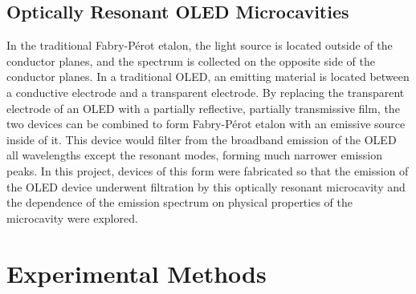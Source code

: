 \documentclass{report}
\begin{document}
    \section{Optically Resonant OLED Microcavities}
        In the traditional Fabry-P\'erot etalon, the light source is located outside of the conductor planes, and the spectrum is collected on the opposite side of the conductor planes. In a traditional OLED, an emitting material is located between a conductive electrode and a transparent electrode. By replacing the transparent electrode of an OLED with a partially reflective, partially transmissive film, the two devices can be combined to form Fabry-P\'erot etalon with an emissive source inside of it. This device would filter from the broadband emission of the OLED all wavelengths except the resonant modes, forming much narrower emission peaks\cite{Hellerich2015}. In this project, devices of this form were fabricated so that the emission of the OLED device underwent filtration by this optically resonant microcavity and the dependence of the emission spectrum on physical properties of the microcavity were explored.

\chapter{Experimental Methods} \label{methods}
\end{document}
